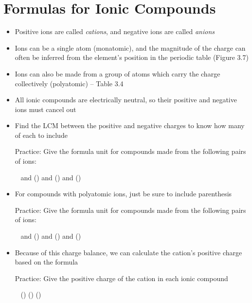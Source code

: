 \documentclass[12pt, openany, letterpaper]{memoir}
\begin{document}
\section{Formulas for Ionic Compounds}
\begin{itemize}
	\item Positive ions are called \emph{cations}, and negative ions are called \emph{anions}
	\item Ions can be a single atom (monatomic), and the magnitude of the charge can often be inferred from the element's position in the periodic table (Figure 3.7)
	\item Ions can also be made from a group of atoms which carry the charge collectively (polyatomic)  -- Table 3.4
	\item All ionic compounds are electrically neutral, so their positive and negative ions must cancel out
	\item Find the LCM between the positive and negative charges to know how many of each to include

	      Practice: Give the formula unit for compounds made from the following pairs of ions:

	      ~\hphantom{Practice:}  and  () \hspace{1em}  and  () \hspace{1em}   and  ()
	\item For compounds with polyatomic ions, just be sure to include parenthesis

	      Practice: Give the formula unit for compounds made from the following pairs of ions:

	      ~\hphantom{Practice:}  and  () \hspace{1em}  and  () \hspace{1em}   and  ()
	\item Because of this charge balance, we can calculate the cation's positive charge based on the formula

	      Practice: Give the positive charge of the cation in each ionic compound

	      ~\hphantom{Practice:}  () \hspace{1em}  () \hspace{1em}  ()
\end{itemize}
\end{document}
